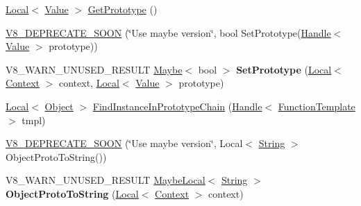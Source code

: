 \begin{DoxyCompactItemize}
\item 
\hyperlink{classv8_1_1_local}{Local}$<$ \hyperlink{classv8_1_1_value}{Value} $>$ \hyperlink{classv8_1_1_object_ae8d3fed7d6dbd667c29cabb3039fe7af}{Get\+Prototype} ()
\item 
\hyperlink{classv8_1_1_object_a26b549de0b4e61519016a3dc92ebf44b}{V8\+\_\+\+D\+E\+P\+R\+E\+C\+A\+T\+E\+\_\+\+S\+O\+O\+N} (\char`\"{}Use maybe version\char`\"{}, bool Set\+Prototype(\hyperlink{classv8_1_1_local}{Handle}$<$ \hyperlink{classv8_1_1_value}{Value} $>$ prototype))
\item 
\hypertarget{classv8_1_1_object_a1f1fc25d2a440ad2a8b7d94db04f88fb}{}V8\+\_\+\+W\+A\+R\+N\+\_\+\+U\+N\+U\+S\+E\+D\+\_\+\+R\+E\+S\+U\+L\+T \hyperlink{classv8_1_1_maybe}{Maybe}$<$ bool $>$ {\bfseries Set\+Prototype} (\hyperlink{classv8_1_1_local}{Local}$<$ \hyperlink{classv8_1_1_context}{Context} $>$ context, \hyperlink{classv8_1_1_local}{Local}$<$ \hyperlink{classv8_1_1_value}{Value} $>$ prototype)\label{classv8_1_1_object_a1f1fc25d2a440ad2a8b7d94db04f88fb}

\item 
\hyperlink{classv8_1_1_local}{Local}$<$ \hyperlink{classv8_1_1_object}{Object} $>$ \hyperlink{classv8_1_1_object_ab2c5f7369abf08ae8f44dc84f5aa335a}{Find\+Instance\+In\+Prototype\+Chain} (\hyperlink{classv8_1_1_local}{Handle}$<$ \hyperlink{classv8_1_1_function_template}{Function\+Template} $>$ tmpl)
\item 
\hyperlink{classv8_1_1_object_abc26147d5f501bf30217f227c9be4922}{V8\+\_\+\+D\+E\+P\+R\+E\+C\+A\+T\+E\+\_\+\+S\+O\+O\+N} (\char`\"{}Use maybe version\char`\"{}, Local$<$ \hyperlink{classv8_1_1_string}{String} $>$ Object\+Proto\+To\+String())
\item 
\hypertarget{classv8_1_1_object_a7a65552d78eff4a1b9755f99167f4255}{}V8\+\_\+\+W\+A\+R\+N\+\_\+\+U\+N\+U\+S\+E\+D\+\_\+\+R\+E\+S\+U\+L\+T \hyperlink{classv8_1_1_maybe_local}{Maybe\+Local}$<$ \hyperlink{classv8_1_1_string}{String} $>$ {\bfseries Object\+Proto\+To\+String} (\hyperlink{classv8_1_1_local}{Local}$<$ \hyperlink{classv8_1_1_context}{Context} $>$ context)\label{classv8_1_1_object_a7a65552d78eff4a1b9755f99167f4255}


\end{DoxyCompactItemize}
